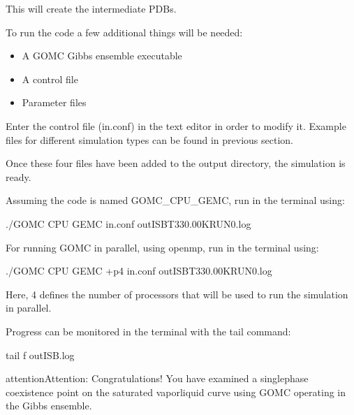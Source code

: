 \documentclass[letterpaper,10pt,english]{sphinxmanual}
\begin{document}
This will create the intermediate PDBs.

To run the code a few additional things will be needed:
\begin{itemize}
\item {} 
A GOMC Gibbs ensemble executable

\item {} 
A control file

\item {} 
Parameter files

\end{itemize}

Enter the control file (in.conf) in the text editor in order to modify it. Example files for different simulation types can be found in previous section.

Once these four files have been added to the output directory, the simulation is ready.

Assuming the code is named GOMC\_CPU\_GEMC, run in the terminal using:

\begin{sphinxVerbatim}[commandchars=\\\{\}]
\PYGZdl{} ./GOMC CPU GEMC in.conf \PYGZgt{} out\PYGZus{}ISB\PYGZus{}T\PYGZus{}330.00\PYGZus{}K\PYGZus{}RUN\PYGZus{}0.log 
\end{sphinxVerbatim}

For running GOMC in parallel, using openmp, run in the terminal using:

\begin{sphinxVerbatim}[commandchars=\\\{\}]
\PYGZdl{} ./GOMC CPU GEMC +p4 in.conf \PYGZgt{} out\PYGZus{}ISB\PYGZus{}T\PYGZus{}330.00\PYGZus{}K\PYGZus{}RUN\PYGZus{}0.log
\end{sphinxVerbatim}

Here, 4 defines the number of processors that will be used to run the simulation in parallel.

Progress can be monitored in the terminal with the tail command:

\begin{sphinxVerbatim}[commandchars=\\\{\}]
\PYGZdl{} tail \PYGZhy{}f out\PYGZus{}ISB.log
\end{sphinxVerbatim}

\begin{sphinxadmonition}{attention}{Attention:}
Congratulations! You have examined a single\sphinxhyphen{}phase coexistence point on the saturated vapor\sphinxhyphen{}liquid curve using GOMC operating in the Gibbs ensemble.
\end{sphinxadmonition}
\end{document}
